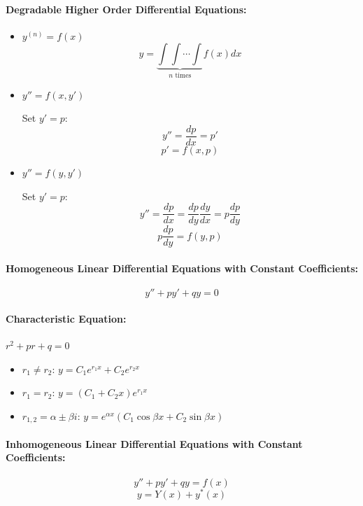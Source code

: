 \documentclass{article}
\begin{document}
\paragraph{Degradable Higher Order Differential Equations:}

\begin{itemize}
    \item $y^{(n)} = f(x)$
    \[
        y = \underbrace{\int \int \cdots \int}_{n \text{ times}} f(x) dx
    \]

    \item $y'' = f(x, y')$

    Set $y' = p$:
    \[
        y'' = \frac{dp}{dx} = p'
    \]
    \[
        p' = f(x, p)
    \]

    \item $y'' = f(y, y')$

    Set $y' = p$:
    \[
        y'' = \frac{dp}{dx} = \frac{dp}{dy} \frac{dy}{dx} = p \frac{dp}{dy}
    \]
    \[
        p \frac{dp}{dy} = f(y, p)
    \]
\end{itemize}

\paragraph{Homogeneous Linear Differential Equations with Constant Coefficients:}

\[
    y'' + py' + qy = 0
\]

\paragraph{Characteristic Equation:} $r^2 + pr + q = 0$

\begin{itemize}
    \item $r_1 \neq r_2$: $y = C_1 e^{r_1 x} + C_2 e^{r_2 x}$
    \item $r_1 = r_2$: $y = (C_1 + C_2 x) e^{r_1 x}$
    \item $r_{1,2} = \alpha \pm \beta i$: $y = e^{\alpha x}(C_1 \cos \beta x + C_2 \sin \beta x)$
\end{itemize}

\paragraph{Inhomogeneous Linear Differential Equations with Constant Coefficients:}

\[
    y'' + py' + qy = f(x)
\]
\[
    y = Y(x) + y^*(x)
\]
\end{document}
